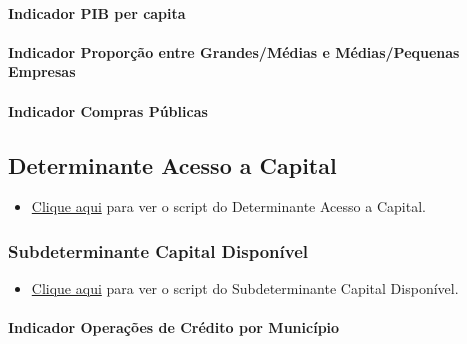 \documentclass[
  12,
  dvipsnames]{article}
\providecommand{\tightlist}{%
  \setlength{\itemsep}{0pt}\setlength{\parskip}{0pt}}
\begin{document}
\hypertarget{indicador-pib-per-capita}{%
\paragraph{Indicador PIB per capita}\label{indicador-pib-per-capita}}

\hypertarget{indicador-proporuxe7uxe3o-entre-grandesmuxe9dias-e-muxe9diaspequenas-empresas}{%
\paragraph{Indicador Proporção entre Grandes/Médias e Médias/Pequenas
Empresas}\label{indicador-proporuxe7uxe3o-entre-grandesmuxe9dias-e-muxe9diaspequenas-empresas}}

\hypertarget{indicador-compras-puxfablicas}{%
\paragraph{Indicador Compras
Públicas}\label{indicador-compras-puxfablicas}}

\hypertarget{det_acesso_capital}{%
\subsection{Determinante Acesso a Capital}\label{det_acesso_capital}}

\begin{itemize}
\tightlist
\item
  \protect\hyperlink{script_2.4}{Clique aqui} para ver o script do
  Determinante Acesso a Capital.
\end{itemize}

\hypertarget{subdet_cap_disp}{%
\subsubsection{Subdeterminante Capital
Disponível}\label{subdet_cap_disp}}

\begin{itemize}
\tightlist
\item
  \protect\hyperlink{script_2.4.1}{Clique aqui} para ver o script do
  Subdeterminante Capital Disponível.
\end{itemize}

\hypertarget{indicador-operauxe7uxf5es-de-cruxe9dito-por-municuxedpio}{%
\paragraph{Indicador Operações de Crédito por
Município}\label{indicador-operauxe7uxf5es-de-cruxe9dito-por-municuxedpio}}
\end{document}
